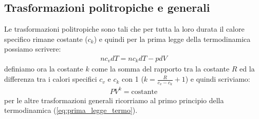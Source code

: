     \subsection{Trasformazioni politropiche e generali}
        Le trasformazioni politropiche sono tali che per tutta la loro durata il calore specifico rimane costante ($c_k$) e quindi per la prima legge della termodinamica possiamo scrivere:
        \begin{align*}
            nc_vdT = nc_kdT - pdV
        \end{align*}
        definiamo ora la costante $k$ come la somma del rapporto tra la costante $R$ ed la differenza tra i calori specifici $c_v$ e $c_k$ con 1 ($k=\frac{R}{c_v-c_k}+1$) e quindi scriviamo:
        \begin{align*}
            PV^{k} = \text{costante}
        \end{align*}
        per le altre trasformazioni generali ricorriamo al primo principio della termodinamica (\ref{eq:prima_legge_termo}).
